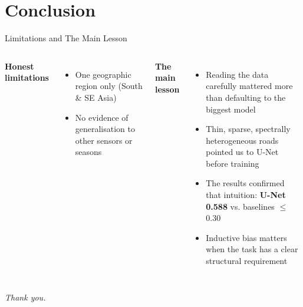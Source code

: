 \documentclass{beamer}
\begin{document}
\section{Conclusion}

\begin{frame}{Limitations and The Main Lesson}
  \begin{columns}[T]
    \textbf{Honest limitations}
    \begin{itemize}
      \item One geographic region only (South \& SE Asia)
      \item No evidence of generalisation to other sensors or seasons
    \end{itemize}

    \textbf{The main lesson}
    \begin{itemize}
      \item Reading the data carefully mattered more than defaulting to the biggest model
      \item Thin, sparse, spectrally heterogeneous roads pointed us to U-Net before training
      \item The results confirmed that intuition: \textbf{U-Net 0.588} vs. baselines $\leq$ 0.30
      \item Inductive bias matters when the task has a clear structural requirement
    \end{itemize}
  \end{columns}
  \vspace{0.5em}
  \centering
  \textit{Thank you.}
\end{frame}
\end{document}
